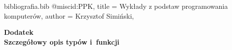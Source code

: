 \documentclass[12pt,a4paper,oneside]{article}
\begin{document}
 
\begin{filecontents}{bibliografia.bib}
@misc{id:PPK,
title = {Wykłady z podstaw programowania komputer\'ow},
author = {Krzysztof Simiński},
}

\end{filecontents}





 
\cleardoublepage

\rule{0cm}{0cm}

\vfill

\begin{center}
\Huge\bfseries Dodatek\\Szczegółowy opis typów i~funkcji\par
\end{center}

\vfill 

\rule{0cm}{0cm}
\end{document}
